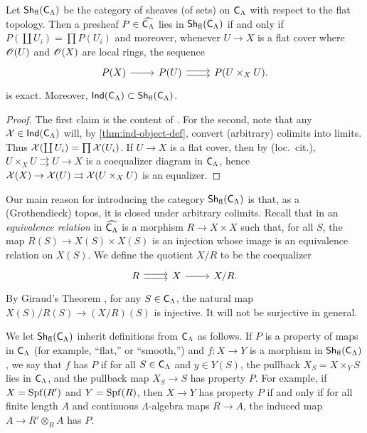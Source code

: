 \begin{lemma}
Let $\operatorname{\mathsf{Sh}}_{\mathrm{fl}}(\mathsf{C}_\Lambda)$ be the category of sheaves (of sets) on 
$\mathsf{C}_\Lambda$ with respect to the flat topology. Then a presheaf 
$P\in \widehat{\mathsf{C}_\Lambda}$ lies in $\operatorname{\mathsf{Sh}}_{\mathrm{fl}}(\mathsf{C}_\Lambda)$ if 
and only if $P(\coprod U_i) = \prod P(U_i)$ and moreover, whenever 
$U \to X$ is a flat cover where $\mathscr{O}(U)$ and $\mathscr{O}(X)$ are local rings, the 
sequence 
\[
\begin{tikzcd}
	P(X) \ar[r]
		& P(U) \ar[r, shift left=.5ex] \ar[r, shift right=.5ex]
		& P(U\times_X U) .
\end{tikzcd}
\]
is exact. Moreover, 
$\operatorname{\mathsf{Ind}}(\mathsf{C}_\Lambda)\subset \operatorname{\mathsf{Sh}}_{\mathrm{fl}}(\mathsf{C}_\Lambda)$. 
\end{lemma}
\begin{proof}
The first claim is the content of \cite[IV 6.3.1(ii)]{sga3-1}. For the second, 
note that any $\mathcal{X}\in \operatorname{\mathsf{Ind}}(\mathsf{C}_\Lambda)$ will, by 
\ref{thm:ind-object-def}, convert (arbitrary) colimits into limits. Thus 
$\mathcal{X}(\coprod U_i) = \prod \mathcal{X}(U_i)$. If $U\to X$ is a flat cover, then by (loc.~cit.), $U\times_X U\rightrightarrows U\to X$ is a coequalizer diagram in 
$\mathsf{C}_\Lambda$, hence 
$\mathcal{X}(X)\to \mathcal{X}(U)\rightrightarrows \mathcal{X}(U\times_X U)$ is an equalizer. 
\end{proof}

Our main reason for introducing the category $\operatorname{\mathsf{Sh}}_{\mathrm{fl}}(\mathsf{C}_\Lambda)$ 
is that, as a (Grothendieck) topos, it is closed under arbitrary colimits. 
Recall that in an \emph{equivalence relation} in $\widehat{\mathsf{C}_\Lambda}$ 
is a morphism $R\to X\times X$ such that, for all $S$, the map 
$R(S)\to X(S)\times X(S)$ is an injection whose image is an equivalence 
relation on $X(S)$. We define the quotient $X/R$ to be the coequalizer 
\[
\begin{tikzcd}
	R \ar[r, shift left=.5ex] \ar[r, shift right=.5ex]
		& X \ar[r]
		& X/R .
\end{tikzcd}
\]
By Giraud's Theorem \cite[App.]{maclane-moerdijk-1994}, for any 
$S\in \mathsf{C}_\Lambda$, the natural map $X(S)/R(S)\to (X/R)(S)$ is injective. 
It will not be surjective in general. 

We let $\operatorname{\mathsf{Sh}}_{\mathrm{fl}}(\mathsf{C}_\Lambda)$ inherit definitions from 
$\mathsf{C}_\Lambda$ as follows. If $P$ is a property of maps in 
$\mathsf{C}_\Lambda$ (for example, ``flat,'' or ``smooth,'') and 
$f\colon X\to Y$ is a morphism in $\operatorname{\mathsf{Sh}}_{\mathrm{fl}}(\mathsf{C}_\Lambda)$, we say 
that $f$ has $P$ if for all $S\in \mathsf{C}_\Lambda$ and $y\in Y(S)$, the 
pullback $X_S=X\times_Y S$ lies in $\mathsf{C}_\Lambda$, and the pullback map 
$X_S\to S$ has property $P$. For example, if $X=\operatorname{Spf}(R')$ and $Y=\operatorname{Spf}(R)$, then 
$X\to Y$ has property $P$ if and only if for all finite length $A$ and 
continuous $\Lambda$-algebra maps $R\to A$, the induced map 
$A\to R'\otimes_R A$ has $P$.

